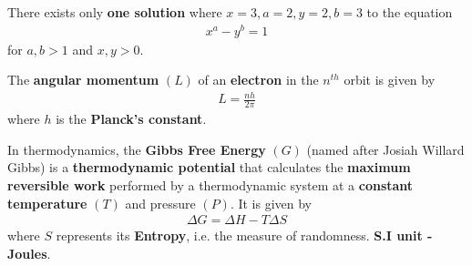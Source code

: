 \documentclass{article}
\begin{document}
\begin{mathbox}
There exists only \textbf{one solution} where $x=3, a=2, y=2, b=3$ to the equation
\begin{align*} 
    \textbf{$x^a - y^b = 1$} 
\end{align*} 
for \textbf{$a,b > 1$} and \textbf{$x,y > 0$}.
\end{mathbox}
\begin{phybox}
The \textbf{angular momentum} $(L)$ of an \textbf{electron} in the $n^{th}$ orbit is given by 
\begin{align*} 
    L = \frac{nh}{2\pi} 
\end{align*} where $h$ is the \textbf{Planck's constant}. 
\end{phybox}
\begin{chembox}
In thermodynamics, the \textbf{Gibbs Free Energy} $(G)$ (named after Josiah Willard Gibbs) is a \textbf{thermodynamic potential} that calculates the \textbf{maximum reversible work} performed by a thermodynamic system at a \textbf{constant temperature} $(T)$ and pressure\textbf{} $(P)$. It is given by 
\begin{align*} 
    \Delta G=\Delta H-T\Delta S 
\end{align*} where $S$ represents its \textbf{Entropy}, i.e. the measure of randomness. \textbf{S.I unit - Joules}.
\end{chembox}
\end{document}
